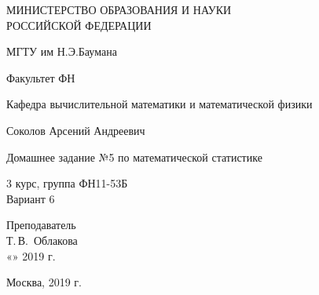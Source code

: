 \documentclass[14pt,a4paper]{scrartcl}
\begin{document}
	\begin{titlepage}
	\begin{center}
		\large
		МИНИСТЕРСТВО ОБРАЗОВАНИЯ И НАУКИ\\ РОССИЙСКОЙ ФЕДЕРАЦИИ
		
		\vspace{0.5cm}
		
		МГТУ им Н.Э.Баумана
		\vspace{0.25cm}
		
		Факультет ФН
		
		Кафедра вычислительной математики и математической физики
		\vfill
		
		
		Соколов Арсений Андреевич\\
		\vfill
		
		
		{\LARGE Домашнее задание №5 по математической статистике\\[2mm]
		}
		\bigskip
		
		3 курс, группа ФН11-53Б\\
		Вариант 6
	\end{center}
	\vfill
	
	\newlength{\ML}
	\hfill\begin{minipage}{0.4\textwidth}
		Преподаватель\\
		\underline{\hspace{3cm}} Т.\,В.~Облакова\\
		«\underline{\hspace{0.7cm}}» \underline{\hspace{1.71cm}} 2019 г.
	\end{minipage}%
	\bigskip
	
	
	\vfill
	
	\begin{center}
		Москва, 2019 г.
	\end{center}
\end{titlepage}
\end{document}
